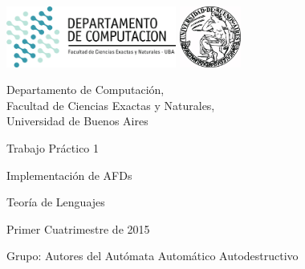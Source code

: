 \documentclass[a4paper, 10pt, twoside]{article}
\begin{document}




\thispagestyle{caratula}

\begin{center}

\includegraphics[height=2cm]{caratula/DC.png}
\hfill
\includegraphics[height=2cm]{caratula/UBA.jpg}

\vspace{2cm}

Departamento de Computación,\\
Facultad de Ciencias Exactas y Naturales,\\
Universidad de Buenos Aires

\vspace{4cm}

\begin{Huge}
Trabajo Práctico 1
\end{Huge}

\vspace{0.5cm}

\begin{huge}
Implementación de AFDs
\end{huge}

\vspace{0.5cm}

\begin{Large}
Teoría de Lenguajes
\end{Large}

\vspace{1cm}

Primer Cuatrimestre de 2015

\vspace{3.5cm}

\begin{Large}
Grupo: Autores del Autómata Automático Autodestructivo
\end{Large}


\end{center}
\end{document}
